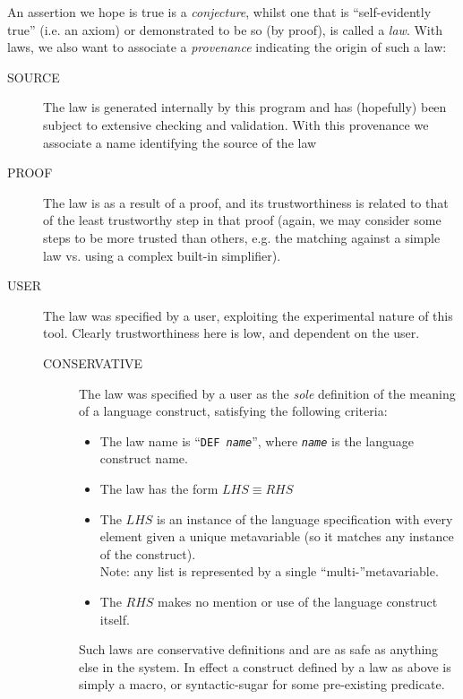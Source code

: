 An assertion we hope is true is a \emph{conjecture},
whilst one that is ``self-evidently true'' (i.e. an axiom)
or demonstrated to be so (by proof), is called a \emph{law}.
With laws, we also want to associate a \emph{provenance}
indicating the origin of
such a law:
\begin{description}
  \item[SOURCE] The law is generated internally by this program
   and has (hopefully) been subject to extensive checking and validation.
   With this provenance we associate a name identifying the source
   of the law
  \item[PROOF] The law is as a result of a proof,
    and its trustworthiness is related to that of
    the least trustworthy step in that proof
    (again, we may consider some steps to
    be more trusted than others,
       e.g. the matching against a simple law vs.
       using a complex built-in simplifier).
  \item[USER] The law was specified by a user,
    exploiting the experimental nature of this tool.
    Clearly trustworthiness here is low, and dependent on the user.
    \begin{description}
      \item[CONSERVATIVE] The law was specified by a user
      as the \emph{sole} definition of the meaning of a language construct,
      satisfying the following criteria:
      \begin{itemize}
        \item The law name is ``\texttt{DEF }\emph{\texttt{name}}'',
        where \emph{\texttt{name}} is the language construct name.
        \item The law has the form $LHS \equiv RHS$
        \item The $LHS$ is an instance of the language specification
         with every element given a unique metavariable
         (so it matches any instance of the construct).
         \\Note: any list is represented by a single ``multi-''metavariable.
        \item The $RHS$ makes no mention or use of the language construct
         itself.
      \end{itemize}
      Such laws are conservative definitions and are as safe
      as anything else in the system.
      In effect a construct defined by a law as above is simply
      a macro, or syntactic-sugar for some pre-existing predicate.
    \end{description}
\end{description}
